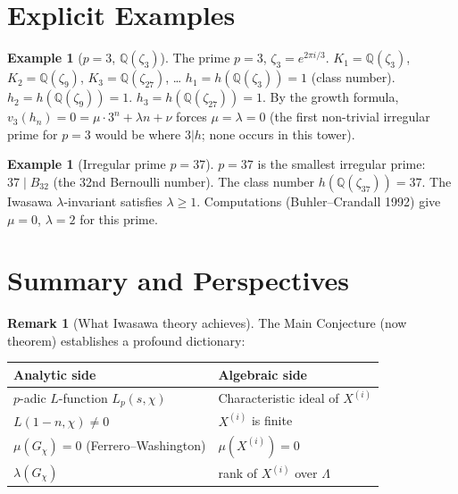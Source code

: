 \documentclass[12pt,a4paper]{amsart}
\theoremstyle{definition}
\newtheorem{example}[theorem]{Example}
\newtheorem{remark}[theorem]{Remark}
\newcommand{\Q}{\mathbb{Q}}
\begin{document}
\section{Explicit Examples}

\begin{example}[$p=3$, $\Q(\zeta_3)$]
The prime $p=3$, $\zeta_3 = e^{2\pi i/3}$.
$K_1 = \Q(\zeta_3)$, $K_2 = \Q(\zeta_9)$, $K_3 = \Q(\zeta_{27})$, \ldots
$h_1 = h(\Q(\zeta_3)) = 1$ (class number).
$h_2 = h(\Q(\zeta_9)) = 1$.
$h_3 = h(\Q(\zeta_{27})) = 1$.
By the growth formula, $v_3(h_n) = 0 = \mu \cdot 3^n + \lambda n + \nu$
forces $\mu = \lambda = 0$ (the first non-trivial irregular prime for $p=3$
would be where $3 | h$; none occurs in this tower).
\end{example}

\begin{example}[Irregular prime $p = 37$]
$p = 37$ is the smallest irregular prime: $37 \mid B_{32}$
(the 32nd Bernoulli number).  The class number $h(\Q(\zeta_{37})) = 37$.
The Iwasawa $\lambda$-invariant satisfies $\lambda \ge 1$.
Computations (Buhler--Crandall 1992) give $\mu = 0$, $\lambda = 2$
for this prime.
\end{example}

\section{Summary and Perspectives}

\begin{remark}[What Iwasawa theory achieves]
The Main Conjecture (now theorem) establishes a profound dictionary:
\begin{center}
\begin{tabular}{l|l}
\textbf{Analytic side} & \textbf{Algebraic side} \\
\hline
$p$-adic $L$-function $L_p(s, \chi)$ & Characteristic ideal of $X^{(i)}$ \\
$L(1-n, \chi) \ne 0$ & $X^{(i)}$ is finite \\
$\mu(G_\chi) = 0$ (Ferrero--Washington) & $\mu(X^{(i)}) = 0$ \\
$\lambda(G_\chi)$ & rank of $X^{(i)}$ over $\Lambda$ \\
\end{tabular}
\end{center}
\end{remark}
\end{document}
